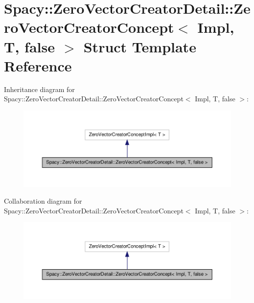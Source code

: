 \hypertarget{structSpacy_1_1ZeroVectorCreatorDetail_1_1ZeroVectorCreatorConcept_3_01Impl_00_01T_00_01false_01_4}{\section{\-Spacy\-:\-:\-Zero\-Vector\-Creator\-Detail\-:\-:\-Zero\-Vector\-Creator\-Concept$<$ \-Impl, \-T, false $>$ \-Struct \-Template \-Reference}
\label{structSpacy_1_1ZeroVectorCreatorDetail_1_1ZeroVectorCreatorConcept_3_01Impl_00_01T_00_01false_01_4}
}


\-Inheritance diagram for \-Spacy\-:\-:\-Zero\-Vector\-Creator\-Detail\-:\-:\-Zero\-Vector\-Creator\-Concept$<$ \-Impl, \-T, false $>$\-:
\nopagebreak
\begin{figure}[H]
\begin{center}
\leavevmode
\includegraphics[width=350pt]{structSpacy_1_1ZeroVectorCreatorDetail_1_1ZeroVectorCreatorConcept_3_01Impl_00_01T_00_01false_01_4__inherit__graph}
\end{center}
\end{figure}


\-Collaboration diagram for \-Spacy\-:\-:\-Zero\-Vector\-Creator\-Detail\-:\-:\-Zero\-Vector\-Creator\-Concept$<$ \-Impl, \-T, false $>$\-:
\nopagebreak
\begin{figure}[H]
\begin{center}
\leavevmode
\includegraphics[width=350pt]{structSpacy_1_1ZeroVectorCreatorDetail_1_1ZeroVectorCreatorConcept_3_01Impl_00_01T_00_01false_01_4__coll__graph}
\end{center}
\end{figure}
